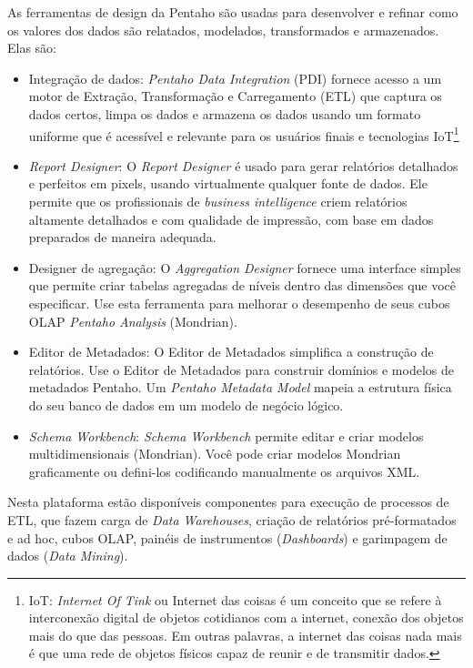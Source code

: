 As ferramentas de design da Pentaho s\~{a}o usadas para desenvolver e refinar como os valores dos dados s\~{a}o relatados, modelados, transformados e armazenados. Elas s\~{a}o:

\begin{itemize}
    \item Integra\c{c}\~{a}o de dados: \textit{Pentaho Data Integration} (PDI) fornece acesso a um motor de Extra\c{c}\~{a}o, Transforma\c{c}\~{a}o e Carregamento (ETL) que captura os dados certos, limpa os dados e armazena os dados usando um formato uniforme que \'{e} acess\'{i}vel e relevante para os usu\'{a}rios finais e tecnologias IoT\footnote{IoT: \textit{Internet Of Tink} ou Internet das coisas \'{e} um conceito que se refere \`{a} interconex\~{a}o digital de objetos cotidianos com a internet, conex\~{a}o dos objetos mais do que das pessoas. Em outras palavras, a internet das coisas nada mais \'{e} que uma rede de objetos f\'{i}sicos capaz de reunir e de transmitir dados.}
    \item \textit{Report Designer}: O \textit{Report Designer} \'{e} usado para gerar relat\'orios detalhados e perfeitos em pixels, usando virtualmente qualquer fonte de dados. Ele permite que os profissionais de \textit{business intelligence} criem relat\'orios altamente detalhados e com qualidade de impress\~{a}o, com base em dados preparados de maneira adequada.
    \item Designer de agrega\c{c}\~{a}o: O \textit{Aggregation Designer} fornece uma interface simples que permite criar tabelas agregadas de n\'{i}veis dentro das dimens\~{o}es que você especificar. Use esta ferramenta para melhorar o desempenho de seus cubos OLAP \textit{Pentaho Analysis} (Mondrian).
    \item Editor de Metadados: O Editor de Metadados simplifica a constru\c{c}\~{a}o de relat\'orios. Use o Editor de Metadados para construir dom\'{i}nios e modelos de metadados Pentaho. Um \textit{Pentaho Metadata Model} mapeia a estrutura f\'{i}sica do seu banco de dados em um modelo de neg\'ocio l\'ogico.
    \item \textit{Schema Workbench}: \textit{Schema Workbench} permite editar e criar modelos multidimensionais (Mondrian). Você pode criar modelos Mondrian graficamente ou defini-los codificando manualmente os arquivos XML.
\end{itemize}

Nesta plataforma est\~{a}o dispon\'{i}veis componentes para execu\c{c}\~{a}o de processos de ETL, que fazem 
carga de \textit{Data Warehouses}, cria\c{c}\~{a}o de relat\'orios pr\'{e}-formatados e ad hoc, cubos OLAP, 
pain\'{e}is de instrumentos (\textit{Dashboards}) e garimpagem de dados (\textit{Data Mining}). 

